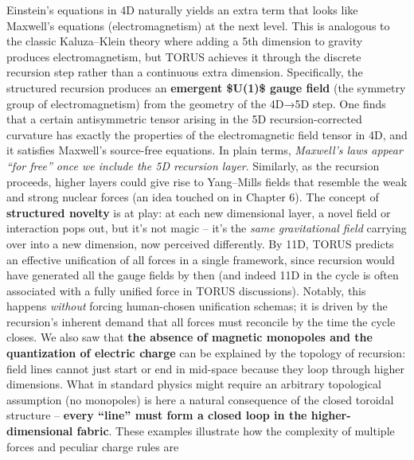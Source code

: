 \documentclass[
]{article}
\begin{document}
{\begin{itemize}
  Einstein's equations in 4D naturally yields an extra term that looks
  like Maxwell's equations (electromagnetism) at the next
  level\hspace{0pt}. This is analogous to the classic Kaluza--Klein
  theory where adding a 5th dimension to gravity produces
  electromagnetism, but TORUS achieves it through the discrete recursion
  step rather than a continuous extra dimension. Specifically, the
  structured recursion produces an \textbf{emergent \$U(1)\$ gauge
  field} (the symmetry group of electromagnetism) from the geometry of
  the 4D→5D step\hspace{0pt}. One finds that a certain antisymmetric
  tensor arising in the 5D recursion-corrected curvature has exactly the
  properties of the electromagnetic field tensor in 4D, and it satisfies
  Maxwell's source-free equations\hspace{0pt}. In plain terms,
  \emph{Maxwell's laws appear ``for free'' once we include the 5D
  recursion layer}. Similarly, as the recursion proceeds, higher layers
  could give rise to Yang--Mills fields that resemble the weak and
  strong nuclear forces (an idea touched on in Chapter 6). The concept
  of \textbf{structured novelty} is at play: at each new dimensional
  layer, a novel field or interaction pops out, but it's not magic --
  it's the \emph{same gravitational field} carrying over into a new
  dimension, now perceived differently. By 11D, TORUS predicts an
  effective unification of all forces in a single framework, since
  recursion would have generated all the gauge fields by then (and
  indeed 11D in the cycle is often associated with a fully unified force
  in TORUS discussions). Notably, this happens \emph{without} forcing
  human-chosen unification schemas; it is driven by the recursion's
  inherent demand that all forces must reconcile by the time the cycle
  closes. We also saw that \textbf{the absence of magnetic monopoles and
  the quantization of electric charge} can be explained by the topology
  of recursion: field lines cannot just start or end in mid-space
  because they loop through higher dimensions\hspace{0pt}. What in
  standard physics might require an arbitrary topological assumption (no
  monopoles) is here a natural consequence of the closed toroidal
  structure -- \textbf{every ``line'' must form a closed loop in the
  higher-dimensional fabric}\hspace{0pt}. These examples illustrate how
  the complexity of multiple forces and peculiar charge rules are

\end{itemize}}
\end{document}
